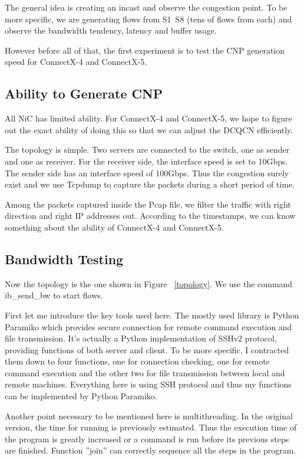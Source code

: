 \documentclass[12pt,a4paper]{article}
\begin{document}
The general idea is creating an incast and observe the congestion point.
To be more specific, we are generating flows from S1~S8 (tens of flows from each) and observe the bandwidth tendency, latency and buffer usage.

However before all of that, the first experiment is to test the CNP generation speed for ConnectX-4 and ConnectX-5. 

\subsection{Ability to Generate CNP}

All NiC has limited ability. For ConnectX-4 and ConnectX-5, we hope to figure out the exact ability of doing this so that we can adjust the DCQCN efficiently.

The topology is simple. Two servers are connected to the switch, one as sender and one as receiver.
For the receiver side, the interface speed is set to 10Gbps. The sender side has an interface speed of 100Gbps.
Thus the congestion surely exist and we use Tcpdump to capture the packets during a short period of time.

Among the packets captured inside the Pcap file, we filter the traffic with right direction and right IP addresses out.
According to the timestamps, we can know something about the ability of ConnectX-4 and ConnectX-5.

\subsection{Bandwidth Testing}

Now the topology is the one shown in Figure ~\ref{topology}.
We use the command ib\_send\_bw to start flows.


First let me introduce the key tools used here.
The mostly used library is Python Paramiko which provides secure connection for remote command execution and file transmission.
It's actually a Python implementation of SSHv2 protocol, providing functions of both server and client.
To be more specific, I contracted them down to four functions, one for connection checking, one for remote command execution and the other two for file
transmission between local and remote machines.
Everything here is using SSH protocol and thus my functions can be implemented by Python Paramiko.

Another point necessary to be mentioned here is multithreading. In the original version, the time for running is previously estimated.
Thus the execution time of the program is greatly increased or a command is run before its previous steps are finished.
Function ''join'' can correctly sequence all the steps in the program.
\end{document}
